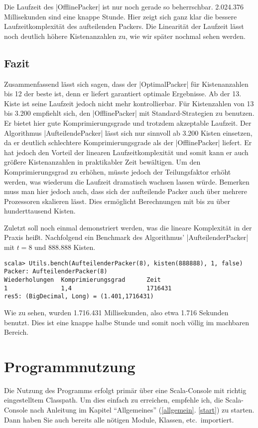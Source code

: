  Die Laufzeit des |OfflinePacker| ist nur noch gerade so beherrschbar. 2.024.376 Millisekunden sind eine knappe Stunde.
 Hier zeigt sich ganz klar die bessere Laufzeitkomplexität des aufteilenden Packers.
 Die Linearität der Laufzeit lässt noch deutlich höhere Kistenanzahlen zu, wie wir später nochmal sehen werden.

\subsection{Fazit}
Zusammenfassend lässt sich sagen, dass der |OptimalPacker| für Kistenanzahlen bis 12 der beste ist, denn er liefert garantiert optimale Ergebnisse.
Ab der 13. Kiste ist seine Laufzeit jedoch nicht mehr kontrollierbar.
Für Kistenzahlen von 13 bis 3.200 empfiehlt sich, den |OfflinePacker| mit Standard-Strategien zu benutzen.
Er bietet hier gute Komprimierungsgrade und trotzdem akzeptable Laufzeit.
Der Algorithmus |AufteilendePacker| lässt sich nur sinnvoll ab 3.200 Kisten einsetzen, da er deutlich schlechtere Komprimierungsgrade als der |OfflinePacker| liefert.
Er hat jedoch den Vorteil der linearen Laufzeitkomplexität und somit kann er auch größere Kistenanzahlen in praktikabler Zeit bewältigen.
Um den Komprimierungsgrad zu erhöhen, müsste jedoch der Teilungsfaktor erhöht werden, was wiederum die Laufzeit dramatisch wachsen lassen würde.
Bemerken muss man hier jedoch auch, dass sich der aufteilende Packer auch über mehrere Prozessoren skalieren lässt.
Dies ermöglicht Berechnungen mit bis zu über hunderttausend Kisten.

Zuletzt soll noch einmal demonstriert werden, was die lineare Komplexität in der Praxis heißt.
Nachfolgend ein Benchmark des Algorithmus' |AufteilenderPacker| mit $t=8$ und 888.888 Kisten.
\begin{lstlisting}
scala> Utils.bench(AufteilenderPacker(8), kisten(888888), 1, false)
Packer: AufteilenderPacker(8)
Wiederholungen  Komprimierungsgrad      Zeit
1               1,4                     1716431
res5: (BigDecimal, Long) = (1.401,1716431)
\end{lstlisting}
Wie zu sehen, wurden 1.716.431 Millisekunden, also etwa 1.716 Sekunden benutzt. Dies ist eine knappe halbe Stunde und somit noch völlig im machbaren Bereich.
\clearpage
\section{Programmnutzung}
\lstset{basicstyle=\ttfamily}
Die Nutzung des Programms erfolgt primär über eine Scala-Console mit richtig eingestelltem Classpath.
Um dies einfach zu erreichen, empfehle ich, die Scala-Console nach Anleitung im Kapitel ``Allgemeines'' (\ref{allgemein}. \ref{start}) zu starten.
Dann haben Sie auch bereits alle nötigen Module, Klassen, etc.\ importiert.

